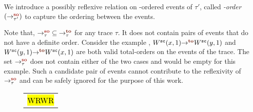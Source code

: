 We introduce a possibly reflexive relation on \sc-ordered
events of $\tau'$, called {\em \sc-order} $(\so{\tau'}{}{})$ to 
capture the ordering between the \sc events. 
%
%
Note that, $\setSO \subseteq \setTO$ for any trace $\tau$. It
does not contain pairs of \sc events that do not have a definite
order. 
%
Consider the example , $\to{}{W^\sc(x,1)}{W^\sc(y,1)}$
and $\to{}{W^\sc(y,1)}{W^\sc(x,1)}$ are both valid total-orders
on the \sc events of the trace.
%
The set $\setSO$ does not contain either of the two cases and 
would be empty for this example.
%
Such a candidate pair of events cannot contribute to the 
reflexivity of $\setSO$ and can be safely ignored for the
purpose of this work. 
\setlength{\textfloatsep}{0pt}
\begin{figure}[h]
	\begin{tabular}{|c|}
		\hline
		\resizebox{0.3\textwidth}{!}{} \\
		\hline
		\multicolumn{1}{c}{\hl{WRWR}}
	\end{tabular}
\end{figure}

